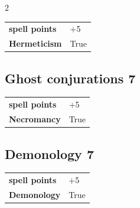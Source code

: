\begin{multicols}{2}
\begin{tcolorbox}
\begin{tabular}{@{}ll@{}}
    \textbf{spell points} & +5\\
    \textbf{Hermeticism} & True\\
\end{tabular}


\end{tcolorbox}

\begin{tcolorbox}
    \subsection*{Ghost conjurations \hfill \small{7 }}
    \tcblower




\begin{tabular}{@{}ll@{}}
    \textbf{spell points} & +5\\
    \textbf{Necromancy} & True\\
\end{tabular}


\end{tcolorbox}

\begin{tcolorbox}
    \subsection*{Demonology \hfill \small{7 }}
    \tcblower




\begin{tabular}{@{}ll@{}}
    \textbf{spell points} & +5\\
    \textbf{Demonology} & True\\
\end{tabular}


\end{tcolorbox}

\begin{tcolorbox}

\end{tcolorbox}
\end{multicols}
